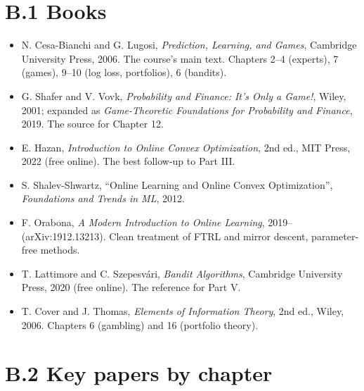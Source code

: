\documentclass[11pt,a4paper,openany]{book}
\begin{document}
\section*{B.1 Books}\label{appB-books}

\begin{itemize}
\item N. Cesa-Bianchi and G. Lugosi, \emph{Prediction, Learning, and Games}, Cambridge University Press, 2006. The course's main text. Chapters 2–4 (experts), 7 (games), 9–10 (log loss, portfolios), 6 (bandits).
\item G. Shafer and V. Vovk, \emph{Probability and Finance: It's Only a Game!}, Wiley, 2001; expanded as \emph{Game-Theoretic Foundations for Probability and Finance}, 2019. The source for Chapter 12.
\item E. Hazan, \emph{Introduction to Online Convex Optimization}, 2nd ed., MIT Press, 2022 (free online). The best follow-up to Part III.
\item S. Shalev-Shwartz, ``Online Learning and Online Convex Optimization'', \emph{Foundations and Trends in ML}, 2012.
\item F. Orabona, \emph{A Modern Introduction to Online Learning}, 2019– (arXiv:1912.13213). Clean treatment of FTRL and mirror descent, parameter-free methods.
\item T. Lattimore and C. Szepesvári, \emph{Bandit Algorithms}, Cambridge University Press, 2020 (free online). The reference for Part V.
\item T. Cover and J. Thomas, \emph{Elements of Information Theory}, 2nd ed., Wiley, 2006. Chapters 6 (gambling) and 16 (portfolio theory).
\end{itemize}

\section*{B.2 Key papers by chapter}\label{appB-papers}
\end{document}
